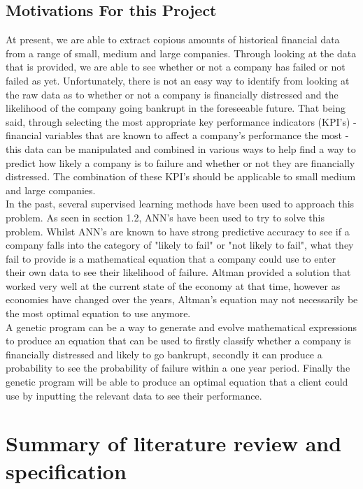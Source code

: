 \documentclass[11pt]{article}
\begin{document}
\subsection{Motivations For this Project}
At present, we are able to extract copious amounts of historical financial data from a range of small, medium and large companies. Through looking at the data that is provided, we are able to see whether or not a company has failed or not failed as yet. Unfortunately, there is not an easy way to identify from looking at the raw data as to whether or not a company is financially distressed and the likelihood of the company going bankrupt in the foreseeable future. That being said, through selecting the most appropriate key performance indicators (KPI's) - financial variables that are known to affect a company's performance the most -  this data can be manipulated and combined in various ways to help find a way to predict how likely a company is to failure and whether or not they are financially distressed. The combination of these KPI's should be applicable to small medium and large companies. \\
In the past, several supervised learning methods have been used to approach this problem. As seen in section 1.2, ANN's have been used to try to solve this problem. Whilst ANN's are known to have strong predictive accuracy to see if a company falls into the category of "likely to fail" or "not likely to fail", what they fail to provide is a mathematical equation that a company could use to enter their own data to see their likelihood of failure. Altman provided a solution that worked very well at the current state of the economy at that time, however as economies have changed over the years, Altman's equation may not necessarily be the most optimal equation to use anymore. \\
A genetic program can be a way to generate and evolve mathematical expressions to produce an equation that can be used to firstly classify whether a company is financially distressed and likely to go bankrupt, secondly it can produce a probability to see the probability of failure within a one year period. Finally the genetic program will be able to produce an optimal equation that a client could use by inputting the relevant data to see their performance. 
\newpage
\section{Summary of literature review and specification}\label{sec:spec}
\end{document}
